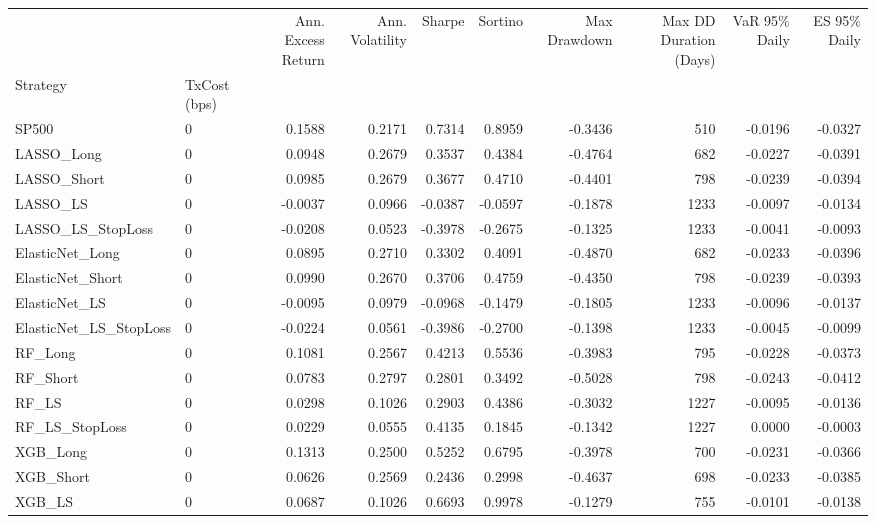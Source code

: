 \begin{tabular}{llrrrrrrrr}
\toprule
 &  & Ann. Excess Return & Ann. Volatility & Sharpe & Sortino & Max Drawdown & Max DD Duration (Days) & VaR 95\% Daily & ES 95\% Daily \\
Strategy & TxCost (bps) &  &  &  &  &  &  &  &  \\
\midrule
SP500 & 0 & 0.1588 & 0.2171 & 0.7314 & 0.8959 & -0.3436 & 510 & -0.0196 & -0.0327 \\
\cline{1-10}
LASSO\_Long & 0 & 0.0948 & 0.2679 & 0.3537 & 0.4384 & -0.4764 & 682 & -0.0227 & -0.0391 \\
\cline{1-10}
LASSO\_Short & 0 & 0.0985 & 0.2679 & 0.3677 & 0.4710 & -0.4401 & 798 & -0.0239 & -0.0394 \\
\cline{1-10}
LASSO\_LS & 0 & -0.0037 & 0.0966 & -0.0387 & -0.0597 & -0.1878 & 1233 & -0.0097 & -0.0134 \\
\cline{1-10}
LASSO\_LS\_StopLoss & 0 & -0.0208 & 0.0523 & -0.3978 & -0.2675 & -0.1325 & 1233 & -0.0041 & -0.0093 \\
\cline{1-10}
ElasticNet\_Long & 0 & 0.0895 & 0.2710 & 0.3302 & 0.4091 & -0.4870 & 682 & -0.0233 & -0.0396 \\
\cline{1-10}
ElasticNet\_Short & 0 & 0.0990 & 0.2670 & 0.3706 & 0.4759 & -0.4350 & 798 & -0.0239 & -0.0393 \\
\cline{1-10}
ElasticNet\_LS & 0 & -0.0095 & 0.0979 & -0.0968 & -0.1479 & -0.1805 & 1233 & -0.0096 & -0.0137 \\
\cline{1-10}
ElasticNet\_LS\_StopLoss & 0 & -0.0224 & 0.0561 & -0.3986 & -0.2700 & -0.1398 & 1233 & -0.0045 & -0.0099 \\
\cline{1-10}
RF\_Long & 0 & 0.1081 & 0.2567 & 0.4213 & 0.5536 & -0.3983 & 795 & -0.0228 & -0.0373 \\
\cline{1-10}
RF\_Short & 0 & 0.0783 & 0.2797 & 0.2801 & 0.3492 & -0.5028 & 798 & -0.0243 & -0.0412 \\
\cline{1-10}
RF\_LS & 0 & 0.0298 & 0.1026 & 0.2903 & 0.4386 & -0.3032 & 1227 & -0.0095 & -0.0136 \\
\cline{1-10}
RF\_LS\_StopLoss & 0 & 0.0229 & 0.0555 & 0.4135 & 0.1845 & -0.1342 & 1227 & 0.0000 & -0.0003 \\
\cline{1-10}
XGB\_Long & 0 & 0.1313 & 0.2500 & 0.5252 & 0.6795 & -0.3978 & 700 & -0.0231 & -0.0366 \\
\cline{1-10}
XGB\_Short & 0 & 0.0626 & 0.2569 & 0.2436 & 0.2998 & -0.4637 & 698 & -0.0233 & -0.0385 \\
\cline{1-10}
XGB\_LS & 0 & 0.0687 & 0.1026 & 0.6693 & 0.9978 & -0.1279 & 755 & -0.0101 & -0.0138 \\

\end{tabular}
